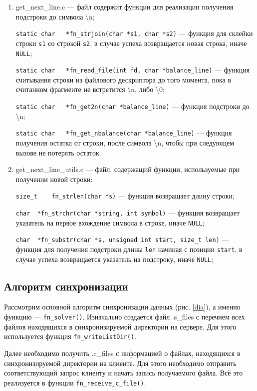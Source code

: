 \begin{enumerate}
	\item get\_next\_line.c --- файл содержит функции для реализации получения подстроки до символа \textbackslash{n};
	
	\verb|static char	*fn_strjoin(char *s1, char *s2)| --- функция для склейки строки \verb|s1| со строкой \verb|s2|, в случае успеха возвращается новая строка, иначе \verb|NULL|;
	
	\verb|static char	*fn_read_file(int fd, char *balance_line)| --- функция считывания строки  из файлового дескриптора до того момента, пока в считанном фрагменте не встретится \textbackslash{n}, либо \textbackslash{0};
	
	\verb|static char	*fn_get2n(char *balance_line)| --- функция подстроки до \textbackslash{n};
	
	\verb|static char	*fn_get_nbalance(char *balance_line)| --- функция получения остатка от строки, после символа \textbackslash{n}, чтобы при следующем вызове не потерять остаток.
	
	\item get\_next\_line\_utils.c --- файл, содержащий функции, используемые при получении новой строки:
	
	\verb|size_t	fn_strlen(char *s)| --- функция возвращает длину строки;
	
	
	\verb|char	*fn_strchr(char *string, int symbol)| --- функция возвращает указатель на первое вхождение символа в строке, иначе \verb|NULL|;
	
	\verb|char	*fn_substr(char *s, unsigned int start, size_t len)| --- функция для получения подстроки длины \verb|len| начиная с позиции \verb|start|, в случае успеха возвращается указатель на подстроку, иначе \verb|NULL|;
\end{enumerate}

\subsection{Алгоритм синхронизации}
Рассмотрим основной алгоритм синхронизации данных (рис. \ref{dia}), а именно функцию --- \verb|fn_solver()|.
Изначально создается файл .s\_files с перечнем всех файлов находящихся в синхронизируемой директории на сервере. Для этого используется функция  \verb|fn_writeListDir()|.

Далее необходимо получить .c\_files с информацией о файлах, находящихся в синхронизируемой директории на клиенте. Для этого необходимо отправить соответствующий запрос клиенту и начать запись получаемого файла. Всё это реализуется в функции \verb|fn_receive_c_file()|.

